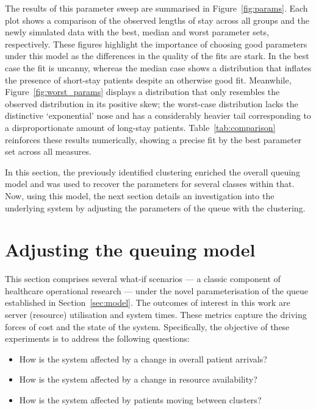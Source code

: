 \documentclass[]{interact}
\theoremstyle{plain}%
\theoremstyle{definition}
\theoremstyle{remark}
\begin{document}
The results of this parameter sweep are summarised in Figure~\ref{fig:params}.
Each plot shows a comparison of the observed lengths of stay across all groups
and the newly simulated data with the best, median and worst parameter sets,
respectively. These figures highlight the importance of choosing good parameters
under this model as the differences in the quality of the fits are stark. In the
best case the fit is uncanny, whereas the median case shows a distribution that
inflates the presence of short-stay patients despite an otherwise good fit.
Meanwhile, Figure~\ref{fig:worst_params} displays a distribution that only
resembles the observed distribution in its positive skew; the worst-case
distribution lacks the distinctive `exponential' nose and has a considerably
heavier tail corresponding to a disproportionate amount of long-stay patients.
Table~\ref{tab:comparison} reinforces these results numerically, showing a
precise fit by the best parameter set across all measures.

\begin{table}
    \centering
    \resizebox{\textwidth}{!}{}
    \caption{%
        A comparison of the observed and simulated data based on the model
        parameters and summary statistics for length of stay
    }\label{tab:comparison}
\end{table}

In this section, the previously identified clustering enriched the overall
queuing model and was used to recover the parameters for several classes within
that. Now, using this model, the next section details an investigation into the
underlying system by adjusting the parameters of the queue with the clustering.

\section{Adjusting the queuing model}\label{sec:scenarios}

This section comprises several what-if scenarios --- a classic component of
healthcare operational research --- under the novel parameterisation of the
queue established in Section~\ref{sec:model}. The outcomes of interest in this
work are server (resource) utilisation and system times. These metrics capture
the driving forces of cost and the state of the system. Specifically, the
objective of these experiments is to address the following questions:
\begin{itemize}
    \item How is the system affected by a change in overall patient arrivals?
    \item How is the system affected by a change in resource availability?
    \item How is the system affected by patients moving between clusters?
\end{itemize}
\end{document}
